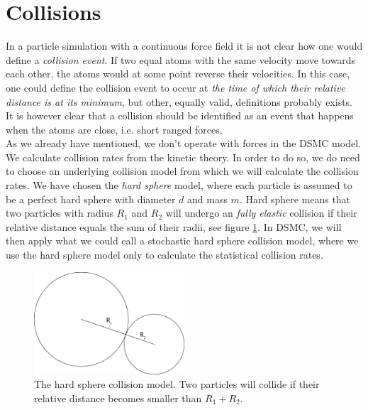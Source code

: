 \section{Collisions}
\label{sec:dsmc_collisions_model}
In a particle simulation with a continuous force field it is not clear how one would define a \textit{collision event}. If two equal atoms with the same velocity move towards each other, the atoms would at some point reverse their velocities. In this case, one could define the collision event to occur at \textit{the time of which their relative distance is at its minimum}, but other, equally valid, definitions probably exists. It is however clear that a collision should be identified as an event that happens when the atoms are close, i.e. short ranged forces.\\
As we already have mentioned, we don't operate with forces in the DSMC model. We calculate collision rates from the kinetic theory. In order to do so, we do need to choose an underlying collision model from which we will calculate the collision rates. We have chosen the \textit{hard sphere} model, where each particle is assumed to be a perfect hard sphere with diameter $d$ and mass $m$. Hard sphere means that two particles with radius $R_1$ and $R_2$ will undergo an \textit{fully elastic} collision if their relative distance equals the sum of their radii, see figure \ref{fig:dsmc_hard_sphere}. In DSMC, we will then apply what we could call a stochastic hard sphere collision model, where we use the hard sphere model only to calculate the statistical collision rates.\\
\begin{figure}[h]
\begin{center}
\includegraphics[width=0.5\textwidth, trim=0cm 0cm 0cm 0cm, clip]{DSMC/figures/collisions.eps}
\end{center}
\caption{The hard sphere collision model. Two particles will collide if their relative distance becomes smaller than $R_1+R_2$.}
\label{fig:dsmc_hard_sphere}
\end{figure}
